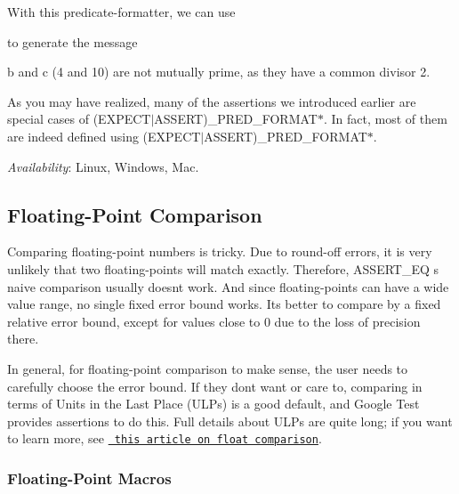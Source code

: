 With this predicate-\/formatter, we can use


\begin{DoxyCode}{0}
\end{DoxyCode}


to generate the message


\begin{DoxyPre}
b and c (4 and 10) are not mutually prime, as they have a common divisor 2.~\newline

\end{DoxyPre}


As you may have realized, many of the assertions we introduced earlier are special cases of {\ttfamily (E\+X\+P\+E\+C\+T$\vert$\+A\+S\+S\+E\+RT)\+\_\+\+P\+R\+E\+D\+\_\+\+F\+O\+R\+M\+A\+T$\ast$}. In fact, most of them are indeed defined using {\ttfamily (E\+X\+P\+E\+C\+T$\vert$\+A\+S\+S\+E\+RT)\+\_\+\+P\+R\+E\+D\+\_\+\+F\+O\+R\+M\+A\+T$\ast$}.

{\itshape Availability}\+: Linux, Windows, Mac.

\subsection*{Floating-\/\+Point Comparison}

Comparing floating-\/point numbers is tricky. Due to round-\/off errors, it is very unlikely that two floating-\/points will match exactly. Therefore, {\ttfamily A\+S\+S\+E\+R\+T\+\_\+\+EQ} \textquotesingle{}s naive comparison usually doesn\textquotesingle{}t work. And since floating-\/points can have a wide value range, no single fixed error bound works. It\textquotesingle{}s better to compare by a fixed relative error bound, except for values close to 0 due to the loss of precision there.

In general, for floating-\/point comparison to make sense, the user needs to carefully choose the error bound. If they don\textquotesingle{}t want or care to, comparing in terms of Units in the Last Place (U\+L\+Ps) is a good default, and Google Test provides assertions to do this. Full details about U\+L\+Ps are quite long; if you want to learn more, see \href{http://www.cygnus-software.com/papers/comparingfloats/comparingfloats.htm}\texttt{ this article on float comparison}.

\subsubsection*{Floating-\/\+Point Macros}

